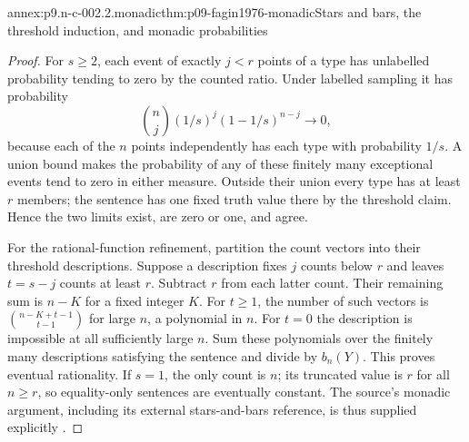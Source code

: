 \begin{annexitem}{annex:p9.n-c-002.2.monadic}{thm:p09-fagin1976-monadic}{Stars and bars, the threshold induction, and monadic probabilities}
\begin{proof}
For \(s\geq2\), each event of exactly \(j<r\) points of a type
has unlabelled probability tending to zero by the counted ratio.
Under labelled sampling it has probability
\[
 \binom nj(1/s)^j(1-1/s)^{n-j}\longrightarrow0,
\]
because each of the \(n\) points independently has each type with
probability \(1/s\).  A union bound makes the probability of any
of these finitely many exceptional events tend to zero in either
measure.  Outside their union every type has at least \(r\) members;
the sentence has one fixed truth value there by the threshold claim.
Hence the two limits exist, are zero or one, and agree.

For the rational-function refinement, partition the count vectors into
their threshold descriptions.  Suppose a description fixes \(j\)
counts below \(r\) and leaves \(t=s-j\) counts at least \(r\).
Subtract \(r\) from each latter count.  Their remaining sum is
\(n-K\) for a fixed integer \(K\).  For \(t\geq1\), the
number of such vectors is \(\binom{n-K+t-1}{t-1}\) for large
\(n\), a polynomial in \(n\).  For \(t=0\) the description
is impossible at all sufficiently large \(n\).  Sum these
polynomials over the finitely many descriptions satisfying the sentence
and divide by \(b_n(Y)\).  This proves eventual rationality.
If \(s=1\), the only count is \(n\); its truncated value is
\(r\) for all \(n\geq r\), so equality-only sentences are
eventually constant.  The source's monadic argument, including its
external stars-and-bars reference, is thus supplied explicitly
\cite[lem.~7 and thm.~9, case~1]{Fagin1976}.
\end{proof}
\end{annexitem}

